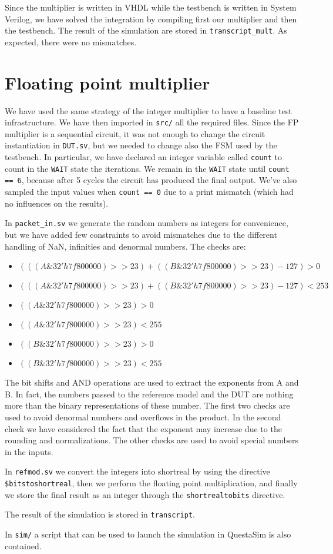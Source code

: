 Since the multiplier is written in VHDL while the testbench is written in System Verilog, we have solved the
integration by compiling first our multiplier and then the testbench. The result of the simulation are stored
in \verb|transcript_mult|. As expected, there were no mismatches.

\section{Floating point multiplier}
We have used the same strategy of the integer multiplier to have a baseline test infrastructure. We have then
imported in \verb|src/| all the required files. Since the FP multiplier is a sequential circuit, it was not enough
to change the circuit instantiation in \verb|DUT.sv|, but we needed to change also the FSM used by the testbench.
In particular, we have declared an integer variable called \verb|count| to count in the \verb|WAIT| state the
iterations. We remain in the \verb|WAIT| state until \verb|count == 6|, because after 5 cycles the circuit has
produced the final output. We've also sampled the input values when \verb|count == 0| due to a print mismatch
(which had no influences on the results).

In \verb|packet_in.sv| we generate the random numbers as integers for convenience, but we have added few
constraints to avoid mismatches due to the different handling of NaN, infinities and denormal numbers.
The checks are:

\begin{itemize}
    \item $(((A \& 32'h7f800000)>>23) + ((B \& 32'h7f800000)>>23) - 127) > 0$
    \item $(((A \& 32'h7f800000)>>23) + ((B \& 32'h7f800000)>>23) - 127) < 253$
    \item $((A \& 32'h7f800000)>>23) > 0$
    \item $((A \& 32'h7f800000)>>23) < 255$
    \item $((B \& 32'h7f800000)>>23) > 0$
    \item $((B \& 32'h7f800000)>>23) < 255$
\end{itemize}

The bit shifts and AND operations are used to extract the exponents from A and B. In fact, the numbers passed
to the reference model and the DUT are nothing more than the binary representations of these number.
The first two checks are used to avoid denormal numbers and overflows in the product. In the second check
we have considered the fact that the exponent may increase due to the rounding and normalizations.
The other checks are used to avoid special numbers in the inputs.

In \verb|refmod.sv| we convert the integers into shortreal by using the directive \verb|$bitstoshortreal|,
then we perform the floating point multiplication, and finally we store the final result as an integer through
the \verb|shortrealtobits| directive.

The result of the simulation is stored in \verb|transcript|.

In \verb|sim/| a script that can be used to launch the simulation in QuestaSim is also contained.